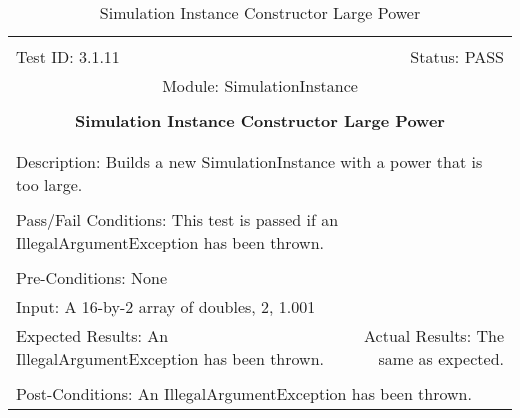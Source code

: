 \documentclass[titlepage]{article}
\begin{document}
\begin{center}
\begin{table}[h!]
\begin{tabular}{|l r|}\hline&\\[-2mm]
	Test ID: 3.1.11	&Status: PASS\\[-3mm]
	\multicolumn{2}{|c|}{Module: SimulationInstance}\\&\\
	\multicolumn{2}{|c|}{\textbf{\large{Simulation Instance Constructor Large Power}}}\\&\\\hline&\\[-3mm]
	\multicolumn{2}{|p{\textwidth}|}{Description: Builds a new SimulationInstance with a power that is too large.}\\[1mm]\hline&\\[-3mm]
	\multicolumn{2}{|p{\textwidth}|}{Pass/Fail Conditions: This test is passed if an IllegalArgumentException has been thrown.}\\[1mm]\hline&\\[-3mm]
	\multicolumn{2}{|p{\textwidth}|}{Pre-Conditions: None}\\[4mm]
	\multicolumn{2}{|p{\textwidth}|}{Input: A 16-by-2 array of doubles, 2, 1.001}\\[2mm]\hline
	\multicolumn{1}{|p{0.49\textwidth}}{Expected Results: An IllegalArgumentException has been thrown.}	&\multicolumn{1}{|p{0.45\textwidth}|}{Actual Results: The same as expected.}\\\hline&\\[-3mm]
	\multicolumn{2}{|p{\textwidth}|}{Post-Conditions: An IllegalArgumentException has been thrown.}\\\hline
\end{tabular}
\caption{Simulation Instance Constructor Large Power}
\end{table}
\end{center}
\end{document}
